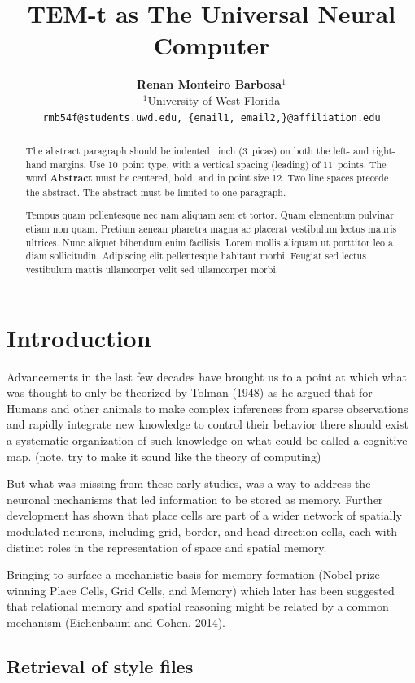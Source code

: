\documentclass{article}
\title{TEM-t as The Universal Neural Computer}
\author{
  \textbf{Renan Monteiro Barbosa$^{1}$} \\ 
  $^{1}$University of West Florida \\ 
  \texttt{rmb54f@students.uwd.edu, \{email1, email2,\}@affiliation.edu}
}
\begin{document}
\maketitle

\begin{abstract}
The abstract paragraph should be indented ~inch (3~picas) on both the left- and right-hand margins. Use 10~point type, with a vertical spacing (leading) of 11~points.  The word \textbf{Abstract} must be centered, bold, and in point size 12. Two line spaces precede the abstract. The abstract must be limited to one paragraph.

Tempus quam pellentesque nec nam aliquam sem et tortor. 
Quam elementum pulvinar etiam non quam. 
Pretium aenean pharetra magna ac placerat vestibulum lectus mauris ultrices. 
Nunc aliquet bibendum enim facilisis. 
Lorem mollis aliquam ut porttitor leo a diam sollicitudin. 
Adipiscing elit pellentesque habitant morbi. 
Feugiat sed lectus vestibulum mattis ullamcorper velit sed ullamcorper morbi.
\end{abstract}


\section{Introduction}

Advancements in the last few decades have brought us to a point at which what was thought to only be theorized by Tolman (1948) as he argued that for Humans and other animals to make complex inferences from sparse observations and rapidly integrate new knowledge to control their behavior there should exist a systematic organization of such knowledge on what could be called a cognitive map. (note, try to make it sound like the theory of computing)

But what was missing from these early studies, was a way to address the neuronal mechanisms that led information to be stored as memory. Further development has shown that place cells are part of a wider network of spatially modulated neurons, including grid, border, and head direction cells, each with distinct roles in the representation of space and spatial memory.

Bringing to surface a mechanistic basis for memory formation (Nobel prize winning Place Cells, Grid Cells, and Memory) which later has been suggested that relational memory and spatial reasoning might be related by a common mechanism (Eichenbaum and Cohen, 2014).


\subsection{Retrieval of style files}
\end{document}
